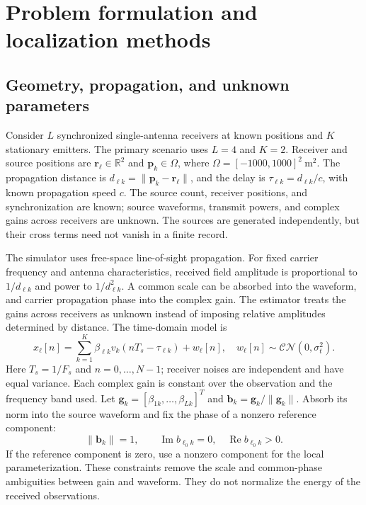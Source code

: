 \section{Problem formulation and localization methods}\label{sec:ug-model}
\subsection{Geometry, propagation, and unknown parameters}\label{sec:ug-assumptions}
Consider $L$ synchronized single-antenna receivers at known positions and $K$ stationary emitters. The primary scenario uses $L=4$ and $K=2$. Receiver and source positions are $\mathbf r_\ell\in\mathbb R^2$ and $\mathbf p_k\in\Omega$, where $\Omega=[-1000,1000]^2\ \mathrm{m}^2$. The propagation distance is $d_{\ell k}=\|\mathbf p_k-\mathbf r_\ell\|$, and the delay is $\tau_{\ell k}=d_{\ell k}/c$, with known propagation speed $c$. The source count, receiver positions, and synchronization are known; source waveforms, transmit powers, and complex gains across receivers are unknown. The sources are generated independently, but their cross terms need not vanish in a finite record.

The simulator uses free-space line-of-sight propagation. For fixed carrier frequency and antenna characteristics, received field amplitude is proportional to $1/d_{\ell k}$ and power to $1/d_{\ell k}^2$. A common scale can be absorbed into the waveform, and carrier propagation phase into the complex gain. The estimator treats the gains across receivers as unknown instead of imposing relative amplitudes determined by distance. The time-domain model is
\begin{equation}\label{eq:ug-time}
x_\ell[n]=\sum_{k=1}^K\beta_{\ell k}v_k(nT_s-\tau_{\ell k})+w_\ell[n],
\quad w_\ell[n]\sim\mathcal{CN}(0,\sigma_t^2).
\end{equation}
Here $T_s=1/F_s$ and $n=0,\ldots,N-1$; receiver noises are independent and have equal variance. Each complex gain is constant over the observation and the frequency band used. Let $\mathbf g_k=[\beta_{1k},\ldots,\beta_{Lk}]^T$ and $\mathbf b_k=\mathbf g_k/\|\mathbf g_k\|$. Absorb its norm into the source waveform and fix the phase of a nonzero reference component:
\begin{equation}\label{eq:ug-gauge}
\|\mathbf b_k\|=1,\qquad
\operatorname{Im}b_{\ell_0 k}=0,\quad \operatorname{Re}b_{\ell_0 k}>0.
\end{equation}
If the reference component is zero, use a nonzero component for the local parameterization. These constraints remove the scale and common-phase ambiguities between gain and waveform. They do not normalize the energy of the received observations.

